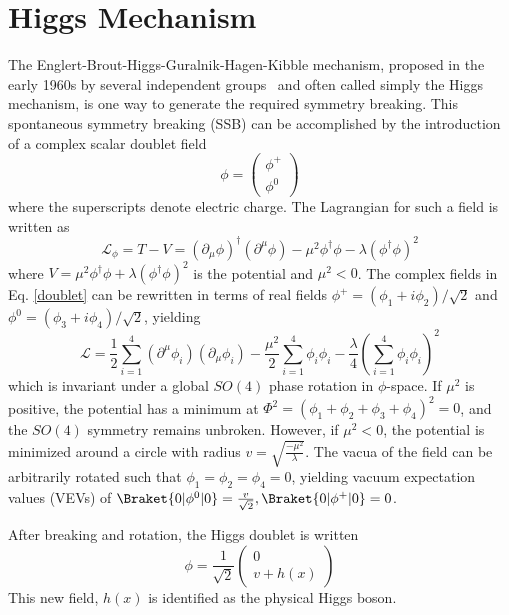 \section{Higgs Mechanism}
The Englert-Brout-Higgs-Guralnik-Hagen-Kibble mechanism, proposed in the early 1960s by several independent groups~\cite{PhysRevLett.13.508, PhysRevLett.13.321, PhysRevLett.13.585} and often called simply the Higgs mechanism, is one way to generate the required symmetry breaking. This spontaneous symmetry breaking (SSB) can be accomplished by the introduction of a complex scalar doublet field
\begin{equation}\label{doublet}
\phi = 
\begin{pmatrix}
\phi^+\\\phi^0
\end{pmatrix}
\end{equation}
where the superscripts denote electric charge. The Lagrangian for such a field is written as
\begin{equation}
\mathcal{L}_{\phi}=T-V=\left(\partial_{\mu}\phi\right)^{\dagger}\left(\partial^{\mu}\phi\right)-\mu^2\phi^{\dagger}\phi-\lambda(\phi^{\dagger}\phi)^2
\label{eq:higgsLagrangian}
\end{equation}
where $V=\mu^2\phi^{\dagger}\phi+\lambda(\phi^{\dagger}\phi)^2$ is the potential and $\mu^2 < 0$. The complex fields in Eq. \ref{doublet} can be rewritten in terms of real fields $\phi^+=(\phi_1+i\phi_2)/\sqrt{2}$ and $\phi^0=(\phi_3+i\phi_4)/\sqrt{2}$, yielding
\begin{equation}\label{eq:lagrange2}
\mathcal{L}=\frac{1}{2}\sum^4_{i=1}(\partial^\mu\phi_i)(\partial_\mu\phi_i)-\frac{\mu^2}{2}\sum^4_{i=1}\phi_i\phi_i-\frac{\lambda}{4}\left(\sum^4_{i=1}\phi_i\phi_i\right)^2
\end{equation} 
which is invariant under a global $SO(4)$ phase rotation in $\phi$-space. If $\mu^2$ is positive, the potential has a minimum at $\Phi^2=(\phi_1+\phi_2+\phi_3+\phi_4)^2=0$, and the $SO(4)$ symmetry remains unbroken. However, if $\mu^2 < 0$, the potential is minimized around a circle with radius $v=\sqrt{\frac{-\mu^2}{\lambda}}$. The vacua of the field can be arbitrarily rotated such that $\phi_1=\phi_2=\phi_4=0$, yielding vacuum expectation values (VEVs) of $\Braket{0|\phi^0|0}=\frac{v}{\sqrt{2}}, \Braket{0|\phi^+|0}=0$.

After breaking and rotation, the Higgs doublet is written
\begin{equation}\label{broken}
\phi = \frac{1}{\sqrt{2}}
\begin{pmatrix}
0\\v+h(x)
\end{pmatrix}
\end{equation}
This new field, $h(x)$ is identified as the physical Higgs boson.\cite{PhysRevLett.13.508, PhysRevLett.13.321, PhysRevLett.13.585}

